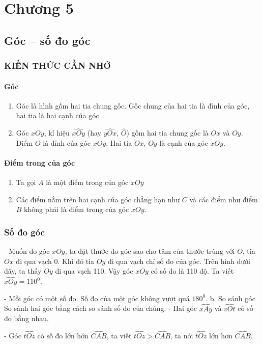 \def\i{\item}
\graphicspath{{../pictures/vande29/}}
\chapter{Chương 5}
\section{Góc -- số đo góc}
\subsection{KIẾN THỨC CẦN NHỚ}
\subsubsection{Góc}
\begin{enumerate}[--,leftmargin=*]
	\i Góc là hình gồm hai tia chung gốc. Gốc chung của hai tia là đỉnh của góc, hai tia là hai cạnh của góc.
	
	\i Góc  $xOy$, kí hiệu $\widehat{xOy}$ (hay $\widehat{yOx},\,\widehat{O}$) gồm hai tia chung gốc là $Ox$ và $Oy$. Điểm $O$ là đỉnh của góc $xOy$. Hai tia $Ox,\,Oy$ là cạnh của góc $xOy$.
\end{enumerate}
\subsubsection{Điểm trong của góc}
\begin{enumerate}[--,leftmargin=*]
	\i Ta gọi $A$ là một điểm trong của góc $xOy$
	\i Các điểm nằm trên hai cạnh của góc chẳng hạn như $C$ và các điểm như điểm $B$ không phải là điểm trong của góc $xOy$.
\end{enumerate}
\subsection{Số đo góc}

- Muốn đo góc $xOy$, ta đặt thước đo góc sao cho tâm của thước trùng với $O$, tia $Ox$ đi qua vạch $0$. Khi đó tia $Oy$ đi qua vạch chỉ số đo của góc. Trên hình dưới đây, ta thấy $Oy$ đi qua vạch 110. Vậy góc $xOy$ có số đo là 110 độ. Ta viết $\widehat{xOy}={{110}^{0}}$.


- Mỗi góc có một số đo. Số đo của một góc không vượt quá ${{180}^{0}}$.
b. So sánh góc
 So sánh hai góc bằng cách so sánh số đo của chúng.
- Hai góc $\widehat{xAy}$ và $\widehat{vOt}$ có số đo bằng nhau.

- Góc $\widehat{tOz}$ có số đo lớn hớn $\widehat{CAB}$, ta viết $\widehat{tOz}>\widehat{CAB}$, ta nói $\widehat{tOz}$ lớn hơn $\widehat{CAB}$.

